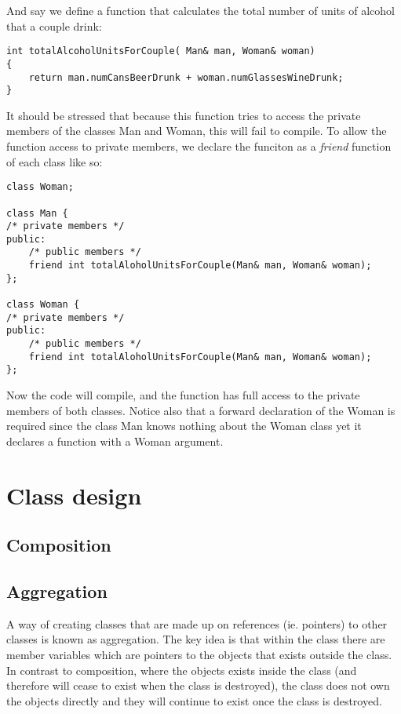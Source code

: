 And say we define a function that calculates the total number of units of alcohol that a couple drink:
\begin{lstlisting}
int totalAlcoholUnitsForCouple( Man& man, Woman& woman)
{
	return man.numCansBeerDrunk + woman.numGlassesWineDrunk;
}
\end{lstlisting}
It should be stressed that because this function tries to access the private members of the classes Man and Woman, this will fail to compile. To allow the function access to private members, we declare the funciton as a \emph{friend} function of each class like so:
\begin{lstlisting}
class Woman;

class Man {
/* private members */
public:
	/* public members */
	friend int totalAloholUnitsForCouple(Man& man, Woman& woman);
};

class Woman {
/* private members */
public:
	/* public members */
	friend int totalAloholUnitsForCouple(Man& man, Woman& woman);
};
\end{lstlisting}
Now the code will compile, and the function has full access to the private members of both classes. Notice also that a forward declaration of the Woman is required since the class Man knows nothing about the Woman class yet it declares a function with a Woman argument.


\section{Class design}
\label{sec:class-design}

\subsection{Composition}
\label{sec:composition}

\subsection{Aggregation}
\label{sec:aggregation}

A way of creating classes that are made up on references
(ie. pointers) to other classes is known as aggregation. The key idea
is that within the class there are member variables which are
pointers to the objects that exists outside the class. In contrast to
composition, where the objects exists inside the class (and therefore
will cease to exist when the class is destroyed), the class does not
own the objects directly and they will continue to exist once the
class is destroyed. 


